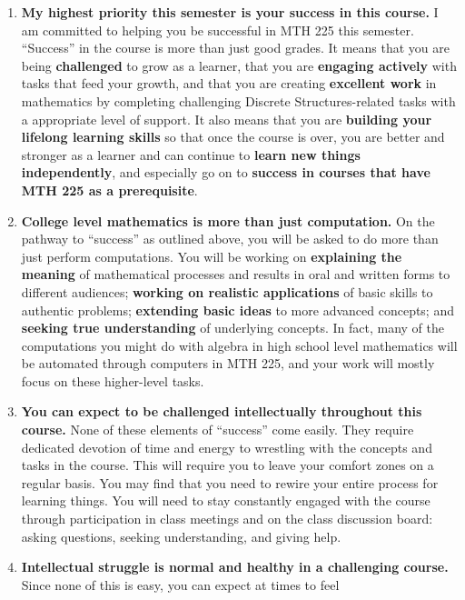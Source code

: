 \documentclass[]{article}
\providecommand{\tightlist}{%
  \setlength{\itemsep}{0pt}\setlength{\parskip}{0pt}}
\begin{document}
\begin{enumerate}
\def\labelenumi{\arabic{enumi}.}
\tightlist
\item
  \textbf{My highest priority this semester is your success in this
  course.} I am committed to helping you be successful in MTH 225 this
  semester. ``Success'' in the course is more than just good grades. It
  means that you are being \textbf{challenged} to grow as a learner,
  that you are \textbf{engaging actively} with tasks that feed your
  growth, and that you are creating \textbf{excellent work} in
  mathematics by completing challenging Discrete Structures-related
  tasks with a appropriate level of support. It also means that you are
  \textbf{building your lifelong learning skills} so that once the
  course is over, you are better and stronger as a learner and can
  continue to \textbf{learn new things independently}, and especially go
  on to \textbf{success in courses that have MTH 225 as a prerequisite}.
\item
  \textbf{College level mathematics is more than just computation.} On
  the pathway to ``success'' as outlined above, you will be asked to do
  more than just perform computations. You will be working on
  \textbf{explaining the meaning} of mathematical processes and results
  in oral and written forms to different audiences; \textbf{working on
  realistic applications} of basic skills to authentic problems;
  \textbf{extending basic ideas} to more advanced concepts; and
  \textbf{seeking true understanding} of underlying concepts. In fact,
  many of the computations you might do with algebra in high school
  level mathematics will be automated through computers in MTH 225, and
  your work will mostly focus on these higher-level tasks.
\item
  \textbf{You can expect to be challenged intellectually throughout this
  course.} None of these elements of ``success'' come easily. They
  require dedicated devotion of time and energy to wrestling with the
  concepts and tasks in the course. This will require you to leave your
  comfort zones on a regular basis. You may find that you need to rewire
  your entire process for learning things. You will need to stay
  constantly engaged with the course through participation in class
  meetings and on the class discussion board: asking questions, seeking
  understanding, and giving help.\\
\item
  \textbf{Intellectual struggle is normal and healthy in a challenging
  course.} Since none of this is easy, you can expect at times to feel

\end{enumerate}
\end{document}
